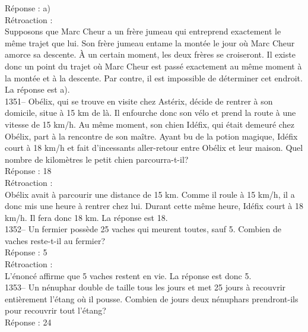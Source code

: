 ﻿\documentclass[letterpaper, 12pt]{article}
\begin{document}
R\'eponse : a)\\

R\'etroaction : \\
Supposons que Marc Cheur a un fr\`ere jumeau qui entreprend exactement le
m\^eme trajet que lui.  Son fr\`ere jumeau entame la mont\'ee le jour o\`u
Marc Cheur amorce sa descente.  \`A un certain moment, les deux fr\`eres se
croiseront.  Il existe donc un point du trajet o\`u Marc Cheur est pass\'e
exactement au m\^eme moment \`a la mont\'ee et \`a la descente.  Par contre,
il est impossible de d\'eterminer cet endroit.  La r\'eponse est a).\\

1351-- Ob\'elix, qui se trouve en visite chez Ast\'erix, d\'ecide de rentrer
\`a son domicile, situe \`a 15 km de l\`a. Il enfourche donc son v\'elo et
prend la route \`a une vitesse de 15 km/h.  Au m\^eme moment, son chien
Id\'efix, qui \'etait demeur\'e chez Ob\'elix, part \`a la rencontre de son
ma\^itre.  Ayant bu de la potion magique, Id\'efix court \`a 18 km/h et fait
d'incessants aller-retour entre Ob\'elix et leur maison.  Quel nombre de
kilom\`etres le petit chien parcourra-t-il?\\

R\'eponse : 18\\

R\'etroaction : \\
Ob\'elix avait \`a parcourir une distance de 15 km.  Comme il roule \`a 15
km/h, il a donc mis une heure \`a rentrer chez lui.  Durant cette m\^eme
heure, Id\'efix court \`a 18 km/h. Il fera donc 18 km.  La r\'eponse est
18.\\

1352-- Un fermier poss\`ede 25 vaches qui meurent toutes, sauf 5.  Combien
de vaches reste-t-il au fermier?\\

R\'eponse : 5\\

R\'etroaction :\\
L'\'enonc\'e affirme que 5 vaches restent en vie.  La r\'eponse est donc
5.\\

1353-- Un n\'enuphar double de taille tous les jours et met 25 jours \`a
recouvrir enti\`erement l'\'etang o\`u il pousse.  Combien de jours deux
n\'enuphars prendront-ils pour recouvrir tout l'\'etang?\\

R\'eponse : 24\\
\end{document}
